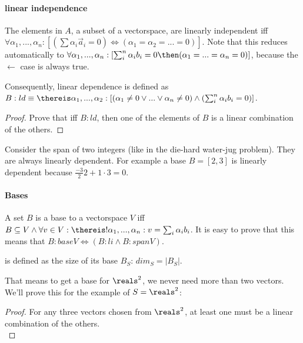 \paragraph{linear independence} 
The elements in $A$, a subset of a vectorspace, are linearly independent iff $\forall \alpha_1, ...,\alpha_n: [( \sum \alpha_i \vec{a}_i = 0 ) \iff ( \alpha_1 = \alpha_2 = ... = 0 )]$. Note that this reduces automatically to $\forall \alpha_1, ...,\alpha_n: [\sum_i^n \alpha_i b_i = 0 \then (\alpha_1 = ... = \alpha_n = 0)]$, because the $\leftarrow$ case is always true. 

Consequently, linear dependence is defined as $B:ld \equiv \thereis \alpha_1, ..., \alpha_2: [(\alpha_1 \neq 0 \lor ... \lor \alpha_n \neq 0) \land ( \sum_i^n \alpha_i b_i = 0 )]$.


\begin{proof}
    Prove that iff $B:ld$, then one of the elements of $B$ is a linear combination of the others. 
\end{proof}

Consider the span of two integers (like in the die-hard water-jug problem). They are always linearly dependent. For example a base $B = [2, 3]$ is linearly dependent because $\frac{-3}{2}2 + 1\cdot3 = 0$.





\paragraph{Bases}
A set $B$ is a base to a vectorspace $V$ iff $ B \subseteq V \land  \forall v \in V: \thereis ! \alpha_1, ..., \alpha_n : v = \sum_i \alpha_i b_i $. It is easy to prove that this means that
$ B:baseV \iff ( B:li \land B:spanV ) $. 


\begin{definition}
    is defined as the size of its base $B_S$: $dim_S = |B_S|$. 
\end{definition}
That means to get a base for $\reals^2$, we never need more than two vectors. We'll prove this for the example of $S = \reals^2$:

\begin{proof} \label{proofBaseSizeEqualsSpaceDimension}
For any three vectors chosen from $\reals^2$, at least one must be a linear combination of the others. \\
\end{proof}

